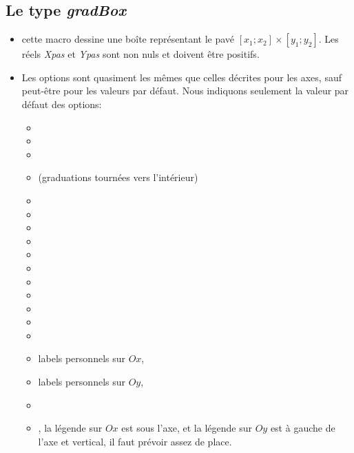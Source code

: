 \subsection{Le type \emph{gradBox}}

{\centering {}\par}

\begin{itemize}
 \item\desc cette macro dessine une boîte représentant le pavé $[x_1;x_2]\times [y_1;y_2]$. Les réels \emph{Xpas} et \emph{Ypas} sont non nuls et doivent être positifs.
 \item Les options sont quasiment les mêmes que celles décrites pour les axes, sauf peut-être pour les valeurs par défaut. Nous indiquons seulement la valeur par défaut des options:
  \begin{itemize}
  \item {} 
  \item {}
  \item {}
  \item {} (graduations tournées vers l'intérieur)
  \item {}
  \item {}
  \item {}
  \item {}
  \item {}
  \item {}
  \item {}
  \item {}
  \item {}
  \item {}
  \item {}
  \item {} labels personnels sur $Ox$,
  \item {} labels personnels sur $Oy$, 
  \item {}
  \item {}, la légende sur $Ox$ est sous l'axe, et la légende sur $Oy$ est à gauche de l'axe et vertical, il faut prévoir assez de place.

\end{itemize}
\end{itemize}
